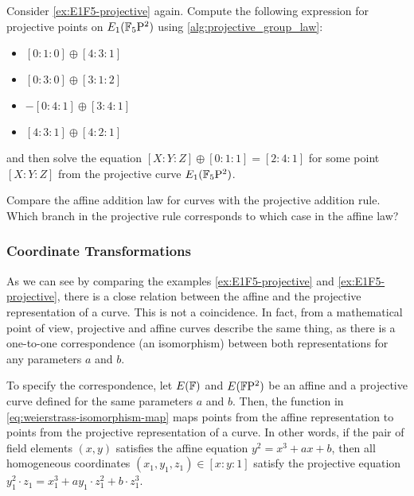 
\begin{exercise} Consider \examplename{} \ref{ex:E1F5-projective} again. Compute the following expression for projective points on $E_1(\mathbb{F}_5\mathrm{P}^2)$ using \algname{} \ref{alg:projective_group_law}:
\begin{itemize}
\item $[0:1:0]\oplus [4:3:1]$
\item $[0:3:0]\oplus [3:1:2]$
\item $-[0:4:1]\oplus [3:4:1]$
\item $[4:3:1]\oplus [4:2:1]$
\end{itemize}
and then solve the equation $[X:Y:Z] \oplus [0:1:1]= [2:4:1]$ for some point $[X:Y:Z]$ from the projective  curve $E_1(\mathbb{F}_5\mathrm{P}^2)$.
\end{exercise}

\begin{exercise}
Compare the affine addition law for  curves with the projective addition rule. Which branch in the projective rule corresponds to which case in the affine law? 
\end{exercise}

\subsubsection{Coordinate Transformations} As we can see by comparing the examples 
\ref{ex:E1F5-projective} and \ref{ex:E1F5-projective}, there is a close relation between the affine and the projective representation of a  curve. This is not a coincidence. In fact, from a mathematical point of view, projective and affine  curves describe the same thing, as there is a one-to-one correspondence (an isomorphism) between both representations for any parameters $a$ and $b$. 

To specify the correspondence, let $E(\mathbb{F})$ and $E(\mathbb{F}\mathrm{P}^2)$ be an affine and a projective  curve defined for the same parameters $a$ and $b$. Then, the function in \eqref{eq:weierstrass-isomorphism-map} maps points from the affine representation to points from the projective representation of a  curve. In other words, if the pair of field elements $(x,y)$ satisfies the affine  equation $y^2= x^3 + ax + b$, then all homogeneous coordinates $(x_1,y_1,z_1)\in [x:y:1]$ satisfy the projective  equation $y_1^2\cdot z_1= x_1^3 + ay_1\cdot z_1^2 + b\cdot z_1^3$. 

